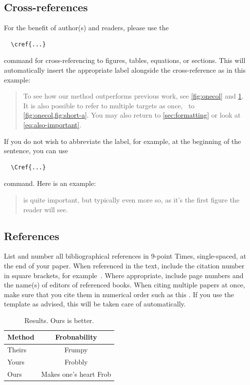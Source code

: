 \subsection{Cross-references}

For the benefit of author(s) and readers, please use the
{\small\begin{verbatim}
  \cref{...}
\end{verbatim}}  command for cross-referencing to figures, tables, equations, or sections.
This will automatically insert the appropriate label alongside the cross-reference as in this example:
\begin{quotation}
  To see how our method outperforms previous work, see \cref{fig:onecol} and \cref{tab:example}.
  It is also possible to refer to multiple targets as once, \eg~to \cref{fig:onecol,fig:short-a}.
  You may also return to \cref{sec:formatting} or look at \cref{eq:also-important}.
\end{quotation}
If you do not wish to abbreviate the label, for example, at the beginning of the sentence, you can use
{\small\begin{verbatim}
  \Cref{...}
\end{verbatim}}
command. Here is an example:
\begin{quotation}
   is quite important, but  typically even more so, as it's the first figure the reader will see.
\end{quotation}

\subsection{References}

List and number all bibliographical references in 9-point Times, single-spaced, at the end of your paper.
When referenced in the text, include the citation number in square brackets, for
example~\cite{Authors14}.
Where appropriate, include page numbers and the name(s) of editors of referenced books.
When citing multiple papers at once, make sure that you cite them in numerical order such as this \cite{Alpher02,Alpher03,Alpher05,Authors14b,Authors14}.
If you use the template as advised, this will be taken care of automatically.

\begin{table}
  \caption{Results.   Ours is better.}
  \label{tab:example}
  \centering
  \begin{tabular}{@{}lc@{}}
    \toprule
    Method & Frobnability \\
    \midrule
    Theirs & Frumpy \\
    Yours & Frobbly \\
    Ours & Makes one's heart Frob\\
    \bottomrule
  \end{tabular}
\end{table}

